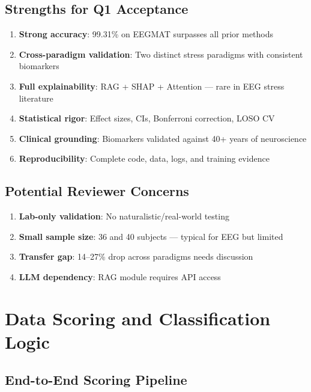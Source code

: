 \documentclass[11pt,a4paper]{article}
\begin{document}
\subsection{Strengths for Q1 Acceptance}

\begin{enumerate}[leftmargin=*]
\item \textbf{Strong accuracy}: 99.31\% on EEGMAT surpasses all prior methods
\item \textbf{Cross-paradigm validation}: Two distinct stress paradigms with consistent biomarkers
\item \textbf{Full explainability}: RAG + SHAP + Attention --- rare in EEG stress literature
\item \textbf{Statistical rigor}: Effect sizes, CIs, Bonferroni correction, LOSO CV
\item \textbf{Clinical grounding}: Biomarkers validated against 40+ years of neuroscience
\item \textbf{Reproducibility}: Complete code, data, logs, and training evidence
\end{enumerate}

\subsection{Potential Reviewer Concerns}

\begin{enumerate}[leftmargin=*]
\item \textbf{Lab-only validation}: No naturalistic/real-world testing
\item \textbf{Small sample size}: 36 and 40 subjects --- typical for EEG but limited
\item \textbf{Transfer gap}: 14--27\% drop across paradigms needs discussion
\item \textbf{LLM dependency}: RAG module requires API access
\end{enumerate}

\section{Data Scoring and Classification Logic}

\subsection{End-to-End Scoring Pipeline}
\end{document}
